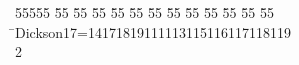 %
%
\begin{tabbing}
55555 \= 55 \= 55 \= 55 \= 55 \= 55 \= 55 \= 55 \= 55 \= 55 \= 55 \= 55 \= 55 \= \>Dickson17=14171819111113115116117118119\\[0pt]
2\>\end{tabbing}
